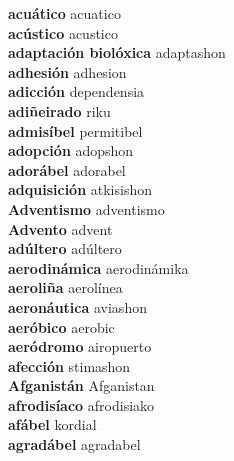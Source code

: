 \textbf{ acuático  } acuatico \\
\textbf{ acústico  } acustico \\
\textbf{ adaptación biolóxica  } adaptashon \\
\textbf{ adhesión  } adhesion \\
\textbf{ adicción  } dependensia \\
\textbf{ adiñeirado  } riku \\
\textbf{ admisíbel  } permitibel \\
\textbf{ adopción  } adopshon \\
\textbf{ adorábel  } adorabel \\
\textbf{ adquisición  } atkisishon \\
\textbf{ Adventismo  } adventismo \\
\textbf{ Advento  } advent \\
\textbf{ adúltero  } adúltero \\
\textbf{ aerodinámica  } aerodinámika \\
\textbf{ aeroliña  } aerolínea \\
\textbf{ aeronáutica  } aviashon \\
\textbf{ aeróbico  } aerobic \\
\textbf{ aeródromo  } airopuerto \\
\textbf{ afección  } stimashon \\
\textbf{ Afganistán  } Afganistan \\
\textbf{ afrodisíaco  } afrodisiako \\
\textbf{ afábel  } kordial \\
\textbf{ agradábel  } agradabel \\
